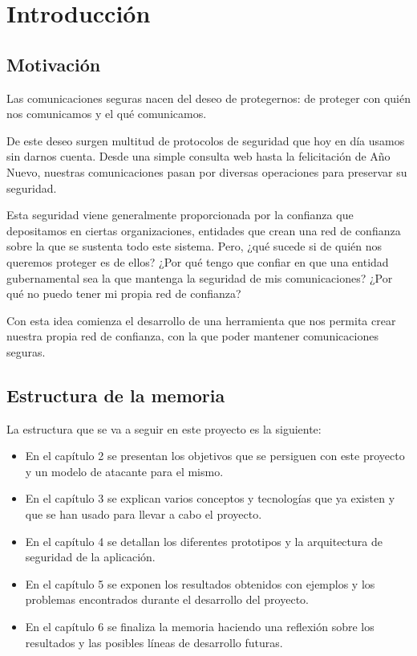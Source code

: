 
\chapter{Introducción} %

\label{Chapter1} %


\section{Motivación}

Las comunicaciones seguras nacen del deseo de protegernos: de proteger con quién nos comunicamos y el qué comunicamos.

De este deseo surgen multitud de protocolos de seguridad que hoy en día usamos sin darnos cuenta.
Desde una simple consulta web hasta la felicitación de Año Nuevo, nuestras comunicaciones pasan por diversas operaciones para preservar su seguridad.

Esta seguridad viene generalmente proporcionada por la confianza que depositamos en ciertas organizaciones,
entidades que crean una red de confianza sobre la que se sustenta todo este sistema.
Pero, ¿qué sucede si de quién nos queremos proteger es de ellos? ¿Por qué tengo
que confiar en que una entidad gubernamental sea la que mantenga la seguridad
de mis comunicaciones? ¿Por qué no puedo tener mi propia red de confianza?

Con esta idea comienza el desarrollo de una herramienta que nos permita crear
nuestra propia red de confianza, con la que poder mantener comunicaciones
seguras.


\section{Estructura de la memoria}

La estructura que se va a seguir en este proyecto es la siguiente:

\begin{itemize}
  \item En el capítulo 2 se presentan los objetivos que se persiguen con este proyecto y un modelo de atacante para el mismo.
  \item En el capítulo 3 se explican varios conceptos y tecnologías que ya existen y que se han usado para llevar a cabo el proyecto.
  \item En el capítulo 4 se detallan los diferentes prototipos y la arquitectura de seguridad de la aplicación.
  \item En el capítulo 5 se exponen los resultados obtenidos con ejemplos y los problemas encontrados durante el desarrollo del proyecto.
  \item En el capítulo 6 se finaliza la memoria haciendo una reflexión sobre los resultados y las posibles líneas de desarrollo futuras.
\end{itemize}
